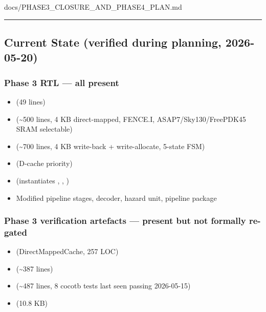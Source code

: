 \begin{relocated}{docs/PHASE3_CLOSURE_AND_PHASE4_PLAN.md}
\begin{center}\rule{0.5\linewidth}{0.5pt}\end{center}

\subsection{Current State (verified during planning, 2026-05-20)}\label{ds:ch:phase3-closure-phase4-plan:2-current-state-verified-during-planning-2026-05-20}

\subsubsection{Phase 3 RTL --- all present}\label{ds:ch:phase3-closure-phase4-plan:phase-3-rtl-all-present}

\begin{itemize}
\tightlist
\item
   \ok{} (49 lines)
\item
   \ok{} (\textasciitilde500 lines, 4 KB
  direct-mapped, FENCE.I,
  ASAP7/\allowbreak{}Sky130/\allowbreak{}FreePDK45 SRAM selectable)
\item
   \ok{} (\textasciitilde700 lines, 4 KB
  write-back + write-allocate, 5-state FSM)
\item
   \ok{} (D-cache priority)
\item
   \ok{} (instantiates ,
  , )
\item
  Modified pipeline stages, decoder, hazard unit, pipeline package \ok{}
\end{itemize}

\subsubsection{Phase 3 verification artefacts --- present but not
formally re-gated}\label{ds:ch:phase3-closure-phase4-plan:phase-3-verification-artefacts-present-but-not-formally-re-gated}

\begin{itemize}
\tightlist
\item
   \ok{} (DirectMappedCache, 257 LOC)
\item
   \ok{} (\textasciitilde387 lines)
\item
   \ok{} (\textasciitilde487 lines, 8
  cocotb tests last seen passing 2026-05-15)
\item
   \ok{} (10.8 KB)
\end{itemize}


\end{relocated}
